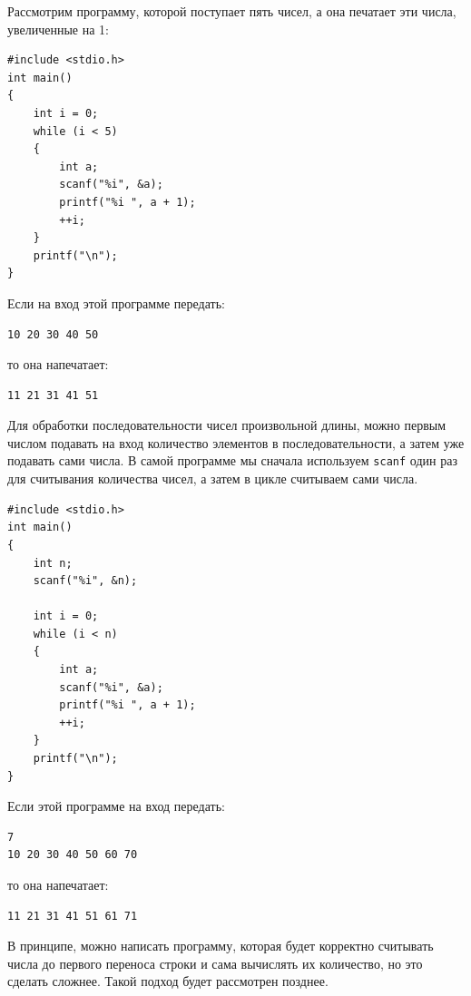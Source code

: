 \documentclass[10pt]{article}
\begin{document}
Рассмотрим программу, которой поступает пять чисел, а она печатает эти числа, увеличенные на 1:
\begin{lstlisting}
#include <stdio.h>
int main()
{
    int i = 0;
    while (i < 5)
    {
        int a;
        scanf("%i", &a);
        printf("%i ", a + 1);
        ++i;
    }
    printf("\n");
}
\end{lstlisting}
Если на вход этой программе передать:
\begin{verbatim}
10 20 30 40 50
\end{verbatim}
то она напечатает:
\begin{verbatim}
11 21 31 41 51
\end{verbatim}

\noindent Для обработки последовательности чисел произвольной длины, можно первым числом подавать на вход количество элементов в последовательности, а затем уже подавать сами числа. В самой программе мы сначала используем \texttt{scanf} один раз для считывания количества чисел, а затем в цикле считываем сами числа.
\begin{lstlisting}
#include <stdio.h>
int main()
{
    int n;
    scanf("%i", &n);
    
    int i = 0;
    while (i < n)
    {
        int a;
        scanf("%i", &a);
        printf("%i ", a + 1);
        ++i;
    }
    printf("\n");
}
\end{lstlisting}
Если этой программе на вход передать:
\begin{verbatim}
7
10 20 30 40 50 60 70
\end{verbatim}
то она напечатает:
\begin{verbatim}
11 21 31 41 51 61 71
\end{verbatim}

\noindent В принципе, можно написать программу, которая будет корректно считывать числа до первого переноса строки и сама вычислять их количество, но это сделать сложнее. Такой подход будет рассмотрен позднее.
\end{document}
